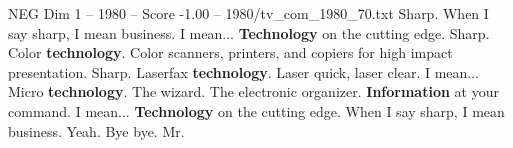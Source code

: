 \begin{textsample}{NEG Dim 1 – 1980 – Score -1.00 – 1980/tv\_com\_1980\_70.txt}  \label{ex:f1_neg_054}
Sharp.
When I say sharp, I mean business.
I mean... \textbf{Technology} on the cutting edge.
Sharp.
Color \textbf{technology}.
Color scanners, printers, and copiers for high impact presentation.
Sharp.
Laserfax \textbf{technology}.
Laser quick, laser clear.
I mean...
Micro \textbf{technology}.
The wizard.
The electronic organizer. \textbf{Information} at your command.
I mean... \textbf{Technology} on the cutting edge.
When I say sharp, I mean business.
Yeah.
Bye bye.
Mr.

\end{textsample}
